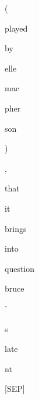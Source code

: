 \documentclass[varwidth=150mm]{standalone}
\begin{document}
\begin{CJK*}{UTF8}{gbsn}
{{{\colorbox{red!3.2335047721862793}{\strut (} \colorbox{red!63.24348831176758}{\strut played} \colorbox{red!2.1961567401885986}{\strut by} \colorbox{red!17.56532859802246}{\strut elle} \colorbox{red!1.8992388248443604}{\strut mac}\colorbox{red!2.255341053009033}{\strut pher}\colorbox{red!4.479520320892334}{\strut son} \colorbox{red!0.0}{\strut )} \colorbox{red!7.984809398651123}{\strut ,} \colorbox{red!50.383358001708984}{\strut that} \colorbox{red!0.0}{\strut it} \colorbox{red!0.0}{\strut brings} \colorbox{red!0.0}{\strut into} \colorbox{red!1.3489545583724976}{\strut question} \colorbox{red!94.60302734375}{\strut bruce} \colorbox{red!1.772682785987854}{\strut '} \colorbox{red!1.7555172443389893}{\strut s} \colorbox{red!3.545583486557007}{\strut late}\colorbox{red!2.503582239151001}{\strut nt} \colorbox{red!1.6255277395248413}{\strut [SEP]}
}}}
\end{CJK*}
\end{document}
